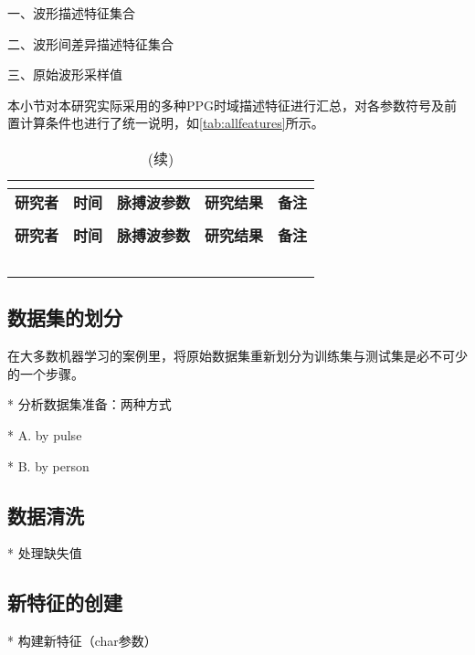 一、波形描述特征集合



二、波形间差异描述特征集合

三、原始波形采样值


本小节对本研究实际采用的多种PPG时域描述特征进行汇总，对各参数符号及前置计算条件也进行了统一说明，如\autoref{tab:allfeatures}所示。
\begin{center}
    \fontsize{10}{4}
    \begin{longtable}{p{3cm}<{\centering}p{1cm}<{\centering}p{2cm}<{\centering}p{6cm}<{\centering}p{1cm}<{\centering}}
        \caption{本研究使用的所有PPG时域指标一览}\\
        \label{tab:allfeatures}\\
        \hline\hline
            \textbf{研究者}&\textbf{时间}&\textbf{脉搏波参数}&\textbf{研究结果}&\textbf{备注}\\
        \hline
        \endfirsthead
        \caption[]{(续)}\\
        \hline
            \textbf{研究者}&\textbf{时间}&\textbf{脉搏波参数}&\textbf{研究结果}&\textbf{备注}\\
        \hline
        \endhead 
        \hline
        \endfoot
        \hline\hline
        \endlastfoot
        &       &       &       &  \\
        &       &       &       &  \\
        &       &       &       &  \\
        &       &       &       &  \\
        &       &       &       &  \\
    \end{longtable}
\end{center}
\subsection{数据集的划分}
在大多数机器学习的案例里，将原始数据集重新划分为训练集与测试集是必不可少的一个步骤。

* 分析数据集准备：两种方式

  * A. by pulse

  * B. by person

\subsection{数据清洗}
* 处理缺失值

\subsection{新特征的创建}
* 构建新特征（char参数）
